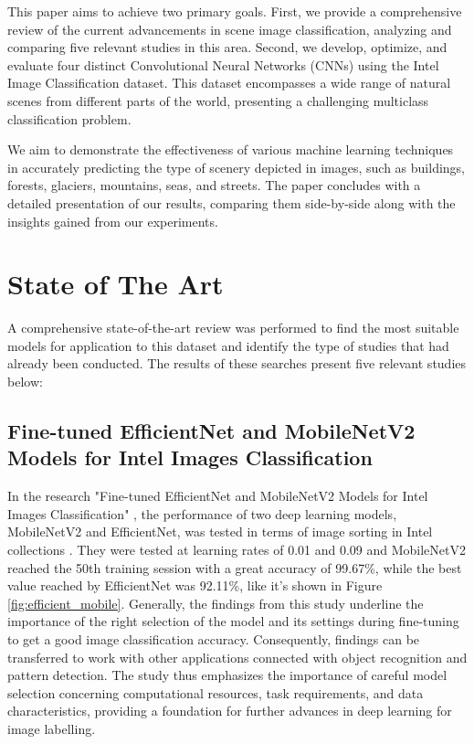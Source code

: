 \documentclass[conference]{IEEEtran}
\begin{document}
This paper aims to achieve two primary goals. First, we provide a comprehensive review of the current advancements in scene image classification, analyzing and comparing five relevant studies in this area. Second, we develop, optimize, and evaluate four distinct Convolutional Neural Networks (CNNs) using the Intel Image Classification dataset. This dataset encompasses a wide range of natural scenes from different parts of the world, presenting a challenging multiclass classification problem.

We aim to demonstrate the effectiveness of various machine learning techniques in accurately predicting the type of scenery depicted in images, such as buildings, forests, glaciers, mountains, seas, and streets. The paper concludes with a detailed presentation of our results, comparing them side-by-side along with the insights gained from our experiments.

\section{State of The Art}

A comprehensive state-of-the-art review was performed to find the most suitable models for application to this dataset and identify the type of studies that had already been conducted. The results of these searches present five relevant studies below:

\subsection{Fine-tuned EfficientNet and MobileNetV2 Models for Intel Images Classification}

In the research "Fine-tuned EfficientNet and MobileNetV2 Models for Intel Images Classification" \cite{MobileNet_EfficientNet}, the performance of two deep learning models, MobileNetV2 and EfficientNet, was tested in terms of image sorting in Intel collections \cite{web:dataset:2019}. They were tested at learning rates of 0.01 and 0.09 and MobileNetV2 reached the 50th training session with a great accuracy of 99.67\%, while the best value reached by EfficientNet was 92.11\%, like it's shown in Figure \ref{fig:efficient_mobile}. Generally, the findings from this study underline the importance of the right selection of the model and its settings during fine-tuning to get a good image classification accuracy. Consequently, findings can be transferred to work with other applications connected with object recognition and pattern detection. The study thus emphasizes the importance of careful model selection concerning computational resources, task requirements, and data characteristics, providing a foundation for further advances in deep learning for image labelling.
\end{document}
